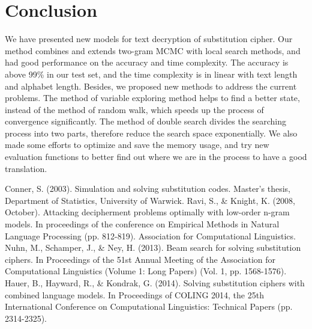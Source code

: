 \documentclass{acmtog} %
\begin{document}
\section{Conclusion}
\label{sec:conclusion}
%
We have presented new models for text decryption of substitution cipher. Our method
combines and extends two-gram MCMC with local search methods, and had good performance on the accuracy and time complexity. The accuracy is above 99\% in our test set, and the time complexity is in linear with text length and alphabet length. Besides, we proposed new methods to address the current problems. The method of variable exploring method helps to find a better state, instead of the method of random walk, which speeds up the process of convergence significantly. The method of double search divides the searching process into two parts, therefore reduce the search space exponentially. We also made some efforts to optimize and save the memory usage, and try new evaluation functions to better find out where we are in the process to have a good translation. 






% 
% 
\begin{thebibliography}{1}
 Conner, S. (2003). Simulation and solving substitution codes. Master's thesis, Department of Statistics, University of Warwick.
 Ravi, S., \& Knight, K. (2008, October). Attacking decipherment problems optimally with low-order n-gram models. In proceedings of the conference on Empirical Methods in Natural Language Processing (pp. 812-819). Association for Computational Linguistics.
 Nuhn, M., Schamper, J., \& Ney, H. (2013). Beam search for solving substitution ciphers. In Proceedings of the 51st Annual Meeting of the Association for Computational Linguistics (Volume 1: Long Papers) (Vol. 1, pp. 1568-1576).
 Hauer, B., Hayward, R., \& Kondrak, G. (2014). Solving substitution ciphers with combined language models. In Proceedings of COLING 2014, the 25th International Conference on Computational Linguistics: Technical Papers (pp. 2314-2325).
\end{thebibliography}

\end{document}
